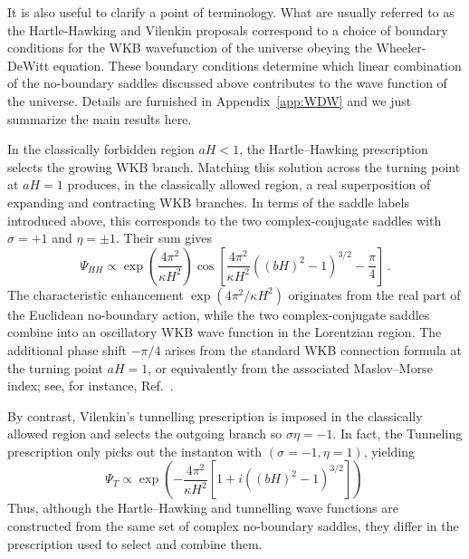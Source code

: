 \documentclass[a4paper,11pt]{article}
\begin{document}
It is also useful to clarify a point of terminology. What are usually referred to as the Hartle-Hawking and Vilenkin proposals correspond to a choice of boundary conditions for the WKB wavefunction of the universe obeying the Wheeler-DeWitt equation. These boundary conditions determine which linear combination of the no-boundary saddles discussed above contributes to the wave function of the universe. Details are furnished in Appendix~\ref{app:WDW} and we just summarize the main results here.

In the classically forbidden region $aH<1$, the Hartle–Hawking prescription selects the growing WKB branch. Matching this solution across the turning point at $aH=1$ produces, in the classically allowed region, a real superposition of expanding and contracting WKB branches. In terms of the saddle labels introduced above, this corresponds to the
two complex-conjugate saddles with $\sigma=+1$ and $\eta=\pm1$. Their sum gives
\begin{equation}
    \Psi_{HH} \propto \exp\left(\frac{4\pi^2}{\kappa H^2}\right)\cos\left[ \frac{4\pi^2}{\kappa H^2}\left((bH)^2-1\right)^{3/2}-\frac{\pi}{4}\right]\,.
\end{equation}
 The characteristic enhancement $\exp(4\pi^2/\kappa H^2)$ originates from the real part of the Euclidean no-boundary action, while the two complex-conjugate saddles combine into an oscillatory WKB wave function in the Lorentzian region. The additional phase shift $-\pi/4$ arises from the standard WKB connection formula at the turning point $aH=1$, or equivalently from the associated Maslov--Morse index; see, for instance, Ref.~\cite{PhysRevD.37.888}.

By contrast, Vilenkin's tunnelling prescription is imposed in the classically allowed region and selects the outgoing branch so $\sigma \eta =-1$. In fact, the Tunneling prescription only picks out the instanton with $(\sigma =-1,\eta=1)$, yielding
\begin{equation}
    \Psi_T \propto \exp\left(-\frac{4\pi^2}{\kappa H^2}\left[1+i\left((bH)^2-1\right)^{3/2}\right]\right)\,
\end{equation}
Thus, although the Hartle--Hawking and tunnelling wave functions are constructed from the same set of complex no-boundary saddles, they differ in the prescription used to select and combine them.
\end{document}
